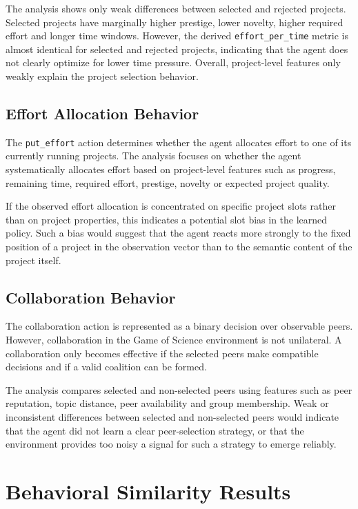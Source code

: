 \documentclass[english,bachelor]{hsluthesis}
\begin{document}
The analysis shows only weak differences between selected and rejected projects. Selected projects have marginally higher prestige, lower novelty, higher required effort and longer time windows. However, the derived \texttt{effort\_per\_time} metric is almost identical for selected and rejected projects, indicating that the agent does not clearly optimize for lower time pressure. Overall, project-level features only weakly explain the project selection behavior.

\subsection{Effort Allocation Behavior}

The \texttt{put\_effort} action determines whether the agent allocates effort to one of its currently running projects. The analysis focuses on whether the agent systematically allocates effort based on project-level features such as progress, remaining time, required effort, prestige, novelty or expected project quality.

If the observed effort allocation is concentrated on specific project slots rather than on project properties, this indicates a potential slot bias in the learned policy. Such a bias would suggest that the agent reacts more strongly to the fixed position of a project in the observation vector than to the semantic content of the project itself.

\subsection{Collaboration Behavior}

The collaboration action is represented as a binary decision over observable peers. However, collaboration in the Game of Science environment is not unilateral. A collaboration only becomes effective if the selected peers make compatible decisions and if a valid coalition can be formed.

The analysis compares selected and non-selected peers using features such as peer reputation, topic distance, peer availability and group membership. Weak or inconsistent differences between selected and non-selected peers would indicate that the agent did not learn a clear peer-selection strategy, or that the environment provides too noisy a signal for such a strategy to emerge reliably.

\section{Behavioral Similarity Results}
\end{document}
